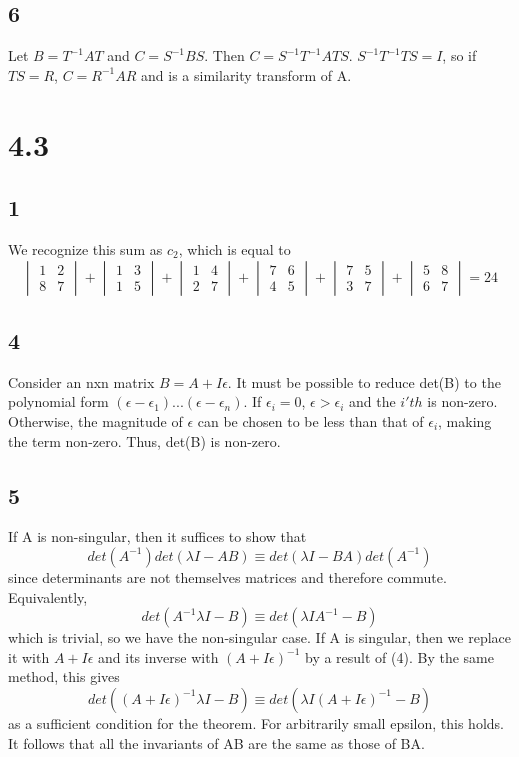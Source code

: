 \documentclass{article}
\begin{document}
\subsection*{6}
Let $B = T^{-1}AT$ and $C = S^{-1}BS$.  Then $C = S^{-1}T^{-1}ATS$.  $S^{-1}T^{-1}TS = I$, so if $TS = R$, $C = R^{-1}AR$ and is a similarity transform of A.

\section*{4.3}
\subsection*{1}
We recognize this sum as $c_2$, which is equal to
$$\begin{vmatrix}1&2\\8&7\end{vmatrix}+\begin{vmatrix}1&3\\1&5\end{vmatrix}+\begin{vmatrix}1&4\\2&7\end{vmatrix}+\begin{vmatrix}7&6\\4&5\end{vmatrix}+\begin{vmatrix}7&5\\3&7\end{vmatrix}+\begin{vmatrix}5&8\\6&7\end{vmatrix}=24$$
\subsection*{4}
Consider an nxn matrix $B = A+I\epsilon$.  It must be possible to reduce det(B) to the polynomial form $(\epsilon-\epsilon_1)...(\epsilon-\epsilon_n)$.  If $\epsilon_i=0$, $\epsilon>\epsilon_i$ and the $i'th$ is non-zero.  Otherwise, the magnitude of $\epsilon$ can be chosen to be less than that of $\epsilon_i$, making the term non-zero.  Thus, det(B) is non-zero.
\subsection*{5}
If A is non-singular, then it suffices to show that
$$det(A^{-1})det(\lambda I-AB) \equiv det(\lambda I-BA)det(A^{-1})$$
since determinants are not themselves matrices and therefore commute.  Equivalently,
$$det(A^{-1}\lambda I-B)\equiv det(\lambda I A^{-1}-B)$$
which is trivial, so we have the non-singular case.  If A is singular, then we replace it with $A+I\epsilon$ and its inverse with $(A+I\epsilon)^{-1}$ by a result of (4).  By the same method, this gives
$$det((A+I\epsilon)^{-1}\lambda I-B)\equiv det(\lambda I(A+I\epsilon)^{-1}-B)$$  as a sufficient condition for the theorem.  For arbitrarily small epsilon, this holds.  It follows that all the invariants of AB are the same as those of BA.
\end{document}
